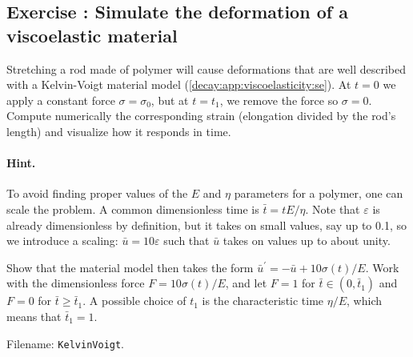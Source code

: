 \documentclass[%
oneside,                 %
final,                   %
10pt]{article}
\newenvironment{doconceexercise}{}{}
\newcounter{doconceexercisecounter}
\begin{document}
\begin{doconceexercise}

\subsection*{Exercise \thedoconceexercisecounter: Simulate the deformation of a viscoelastic material}

\label{decay:app:exer:viscoelasticity1}

Stretching a rod made of polymer will cause deformations that are
well described with a Kelvin-Voigt material model
(\ref{decay:app:viscoelasticity:se}). At $t=0$ we apply a constant
force $\sigma = \sigma_0$, but at $t=t_1$, we remove the force
so $\sigma=0$. Compute numerically the corresponding strain
(elongation divided by the rod's length) and visualize how it
responds in time.


\paragraph{Hint.}
To avoid finding proper values of the $E$ and $\eta$ parameters for
a polymer, one can scale the problem. A common dimensionless
time is $\bar t= tE/\eta$. Note that $\varepsilon$ is already
dimensionless by definition, but it takes on small values, say up to 0.1,
so we introduce a scaling: $\bar u=10\varepsilon$ such that $\bar u$
takes on values up to about unity.

Show that the material model then
takes the form $\bar u^{\prime} = -\bar u + 10\sigma(t)/E$.
Work with the dimensionless force $F=10\sigma(t)/E$, and let
$F=1$ for $\bar t\in (0,\bar t_1)$ and $F=0$ for $\bar t\geq \bar t_1$.
A possible choice of $t_1$ is the characteristic time $\eta/E$, which
means that $\bar t_1 = 1$.



\noindent Filename: \texttt{KelvinVoigt}.

\end{doconceexercise}








\cleardoublepage{}  %
\printindex
\end{document}
